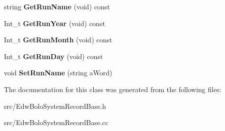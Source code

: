 \begin{DoxyCompactItemize}
\item 
\hypertarget{class_edw_bolo_system_record_base_a87bd5dfe235195c7adbed54b8651debe}{
string {\bfseries GetRunName} (void) const }
\label{class_edw_bolo_system_record_base_a87bd5dfe235195c7adbed54b8651debe}

\item 
\hypertarget{class_edw_bolo_system_record_base_ab2987fa128400faa532fc429c6690d0e}{
Int\_\-t {\bfseries GetRunYear} (void) const }
\label{class_edw_bolo_system_record_base_ab2987fa128400faa532fc429c6690d0e}

\item 
\hypertarget{class_edw_bolo_system_record_base_a5b0f07c68be81e0d821808883e36bdf7}{
Int\_\-t {\bfseries GetRunMonth} (void) const }
\label{class_edw_bolo_system_record_base_a5b0f07c68be81e0d821808883e36bdf7}

\item 
\hypertarget{class_edw_bolo_system_record_base_ab7e4676583b14d334f7e41dadb616564}{
Int\_\-t {\bfseries GetRunDay} (void) const }
\label{class_edw_bolo_system_record_base_ab7e4676583b14d334f7e41dadb616564}

\item 
\hypertarget{class_edw_bolo_system_record_base_ab36a1410e57b6229841213ad97e1dc10}{
void {\bfseries SetRunName} (string aWord)}
\label{class_edw_bolo_system_record_base_ab36a1410e57b6229841213ad97e1dc10}

\end{DoxyCompactItemize}


The documentation for this class was generated from the following files:\begin{DoxyCompactItemize}
\item 
src/EdwBoloSystemRecordBase.h\item 
src/EdwBoloSystemRecordBase.cc\end{DoxyCompactItemize}
